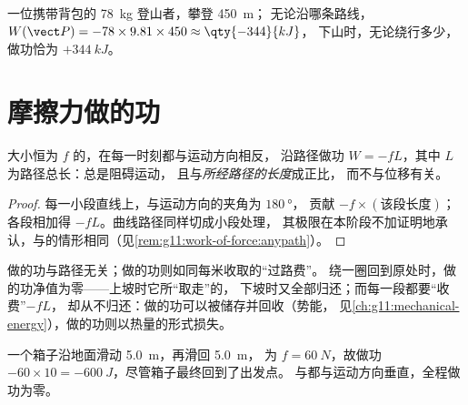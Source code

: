 \begin{example}[登山者]\label{ex:g11:work-of-force:hiker}
一位携带背包的 \qty{78}{kg} 登山者，攀登 \qty{450}{m}；
无论沿哪条路线，$W(\vect P) = -78 \times 9.81 \times 450 \approx \qty{-344}{kJ}$，
下山时，无论绕行多少，做功恰为 $+\qty{344}{kJ}$。
\end{example}

\section{摩擦力做的功}

\begin{proposition}[滑动摩擦力做的功]\label{prop:g11:work-of-force:friction}
大小恒为 $f$ 的，在每一时刻都与运动方向相反，
沿路径做功 $W = -fL$，其中 $L$ 为路径总长：总是阻碍运动，
且与\emph{所经路径的长度}成正比，
而不与位移有关。
\end{proposition}

\begin{proof}
每一小段直线上，与运动方向的夹角为 $\qty{180}{\degree}$，
贡献 $-f \times (\text{该段长度})$；各段相加得
$-fL$。曲线路径同样切成小段处理，
其极限在本阶段不加证明地承认，与的情形相同（见\cref{rem:g11:work-of-force:anypath}）。
\end{proof}

\begin{remark}\label{rem:g11:work-of-force:divide}
做的功与路径无关；做的功则如同每米收取的“过路费”。
绕一圈回到原处时，做的功净值为零——上坡时它所“取走”的，
下坡时又全部归还；而每一段都要“收费”$-fL$，
却从不归还：做的功可以被储存并回收（势能，
见\cref{ch:g11:mechanical-energy}），做的功则以热量的形式损失。
\end{remark}

\begin{example}[往返一次]\label{ex:g11:work-of-force:roundtrip}
一个箱子沿地面滑动 \qty{5.0}{m}，再滑回 \qty{5.0}{m}，
为 $f = \qty{60}{N}$，故做功 $-60 \times 10 =
\qty{-600}{J}$，尽管箱子最终回到了出发点。
与都与运动方向垂直，全程做功为零。
\end{example}

